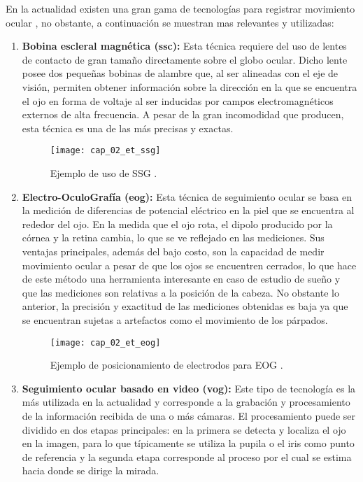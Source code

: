 \documentclass[../main.tex]{subfiles}
\begin{document}
				En la actualidad existen una gran gama de tecnologías para registrar movimiento ocular \cite{article:eyetracker_eggert, article:eyetracker_richardson, dissertation:eyetrackers}, no obstante, a continuación se muestran mas relevantes y utilizadas: 
				\begin{enumerate}
					\item \textbf{Bobina escleral magnética (\acrshort{ssc}):} Esta técnica requiere del uso de lentes de contacto de gran tamaño directamente sobre el globo ocular. Dicho lente posee dos pequeñas bobinas de alambre que, al ser alineadas con el eje de visión, permiten obtener información sobre la dirección en la que se encuentra el ojo en forma de voltaje al ser inducidas por campos electromagnéticos externos de alta frecuencia. A pesar de la gran incomodidad que producen, esta técnica es una de las más precisas y exactas.
					\begin{figure}[H]
						\centering
						\texttt{[image: cap\_02\_et\_ssg]}
						\caption{Ejemplo de uso de SSG \cite{website:etSSG}.}
						\label{fig:02_et_ssg}
					\end{figure}

					\item \textbf{Electro-OculoGrafía (\acrshort{eog}):} Esta técnica de seguimiento ocular se basa en la medición de diferencias de potencial eléctrico en la piel que se encuentra al rededor del ojo. En la medida que el ojo rota, el dipolo producido por la córnea y la retina cambia, lo que se ve reflejado en las mediciones. Sus ventajas principales, además del bajo costo, son la capacidad de medir movimiento ocular a pesar de que los ojos se encuentren cerrados, lo que hace de este método una herramienta interesante en caso de estudio de sueño y que las mediciones son relativas a la posición de la cabeza. No obstante lo anterior, la precisión y exactitud de las mediciones obtenidas es baja ya que se encuentran sujetas a artefactos como el movimiento de los párpados.
					\begin{figure}[H]
						\centering
						\texttt{[image: cap\_02\_et\_eog]}
						\caption{Ejemplo de posicionamiento de electrodos para EOG \cite{website:etEOG}.}
						\label{fig:02_et_eog}
					\end{figure}

					\item \textbf{Seguimiento ocular basado en video (\acrshort{vog}):} Este tipo de tecnología es la más utilizada en la actualidad y corresponde a la grabación y procesamiento de la información recibida de una o más cámaras. El procesamiento puede ser dividido en dos etapas principales: en la primera se detecta y localiza el ojo en la imagen, para lo que típicamente se utiliza la pupila o el iris como punto de referencia y la segunda etapa corresponde al proceso por el cual se estima hacia donde se dirige la mirada. 


\end{enumerate}
\end{document}
